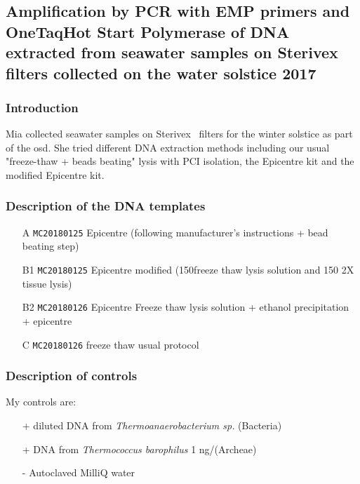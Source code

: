 \subsection{Amplification by PCR with EMP primers and OneTaq\cR Hot Start Polymerase of DNA extracted from seawater samples on Sterivex\texttrademark~ filters collected on the water solstice 2017}
\label{task:20180130_cj0}

\subsubsection{Introduction}
Mia collected seawater samples on Sterivex\texttrademark~ filters for the winter solstice as part of the \gls{osd}. She tried different DNA extraction methods including our usual "freeze-thaw + beads beating" lysis with PCI isolation, the Epicentre kit and the modified Epicentre kit.

\subsubsection{Description of the DNA templates}
\begin{itemize}
\item[A] \texttt{MC20180125} Epicentre (following manufacturer's instructions + bead beating step)
\item[B1] \texttt{MC20180125} Epicentre modified (150\uL freeze thaw lysis solution and 150 \uL 2X tissue lysis)
\item[B2] \texttt{MC20180126} Epicentre Freeze thaw lysis solution + ethanol precipitation + epicentre
\item[C] \texttt{MC20180126} freeze thaw usual protocol
\end{itemize}


\subsubsection{Description of controls}
My controls are:
\begin{itemize}
\item[+] diluted DNA from \textit{Thermoanaerobacterium sp.} (Bacteria)
\item[+] DNA from \textit{Thermococcus barophilus} 1 ng/\uL (Archeae)
\item[-] Autoclaved MilliQ water
\end{itemize}


